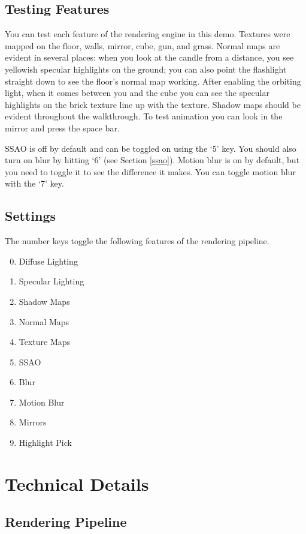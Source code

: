 \documentclass{book}
\begin{document}
  \section{Testing Features}
    You can test each feature of the rendering engine in this demo. Textures were mapped on the floor, walls, mirror, cube, gun, and grass. Normal maps are evident in several places: when you look at the candle from a distance, you see yellowish specular highlights on the ground; you can also point the flashlight straight down to see the floor's normal map working. After enabling the orbiting light, when it comes between you and the cube you can see the specular highlights on the brick texture line up with the texture. Shadow maps should be evident throughout the walkthrough. To test animation you can look in the mirror and press the space bar.

    SSAO is off by default and can be toggled on using the `5' key. You should also turn on blur by hitting `6' (see Section \ref{ssao}).
    Motion blur is on by default, but you need to toggle it to see the difference it makes. You can toggle motion blur with the `7' key.

  \section{Settings}\label{settings}
    The number keys toggle the following features of the rendering pipeline.
    \begin{enumerate}
      \setcounter{enumi}{-1}
      \item Diffuse Lighting
      \item Specular Lighting
      \item Shadow Maps
      \item Normal Maps
      \item Texture Maps
      \item SSAO
      \item Blur
      \item Motion Blur
      \item Mirrors
      \item Highlight Pick
    \end{enumerate}

\chapter{Technical Details}
  \section{Rendering Pipeline}
\end{document}
